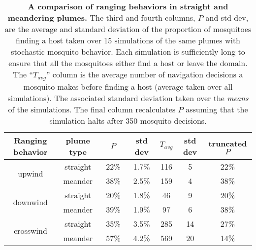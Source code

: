 \documentclass[10pt]{article}
\date{}
\begin{document}
\begin{table}[!ht]
\caption{{\bf A comparison of ranging behaviors in straight and meandering plumes.} The third and fourth columns, $P$ and std dev, are the average and standard deviation of the proportion of mosquitoes finding a host taken over 15 simulations of the same plumes with stochastic mosquito behavior. Each simulation is sufficiently long to ensure that all the mosquitoes either find a host or leave the domain. The ``$T_{avg}$'' column is the average number of navigation decisions a mosquito makes before finding a host (average taken over all simulations). The associated standard deviation taken over the \emph{means} of the simulations. The final column recalculates $P$ assuming that the simulation halts after 350 mosquito decisions.}
	\begin{center}
		\begin{tabular}{|c|c|c|c|c|c|c|}
			\hline
			Ranging behavior & plume type &$ \quad P \quad $& std dev & $T_{avg}$ & std dev & truncated $P$\\
			\hline
			\multirow{2}{*}{upwind} & straight &22\% & 1.7\% & 116 & 5 & 22\%\\
										&  meander & 38\% & 2.5\% & 159 & 4 & 38\%\\
										\hline
			\multirow{2}{*}{downwind} & straight &20\% & 1.8\% & 46 & 9 & 20\%\\
										&  meander & 39\% & 1.9\% & 97 & 6 & 38\%\\
										\hline
			\multirow{2}{*}{crosswind} & straight &35\% & 3.5\% & 285 & 14 & 27\%\\
										&  meander & 57\% & 4.2\% & 569 & 20 & 14\%\\
			\hline
		\end{tabular}
		\label{tab:meander}
	\end{center}
\end{table}
		
	
\end{document}
